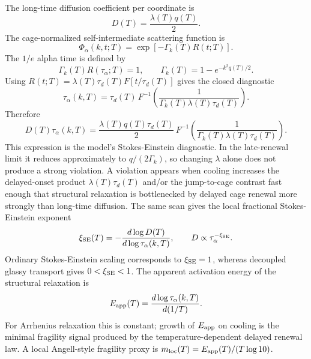 \documentclass[aps,preprint,onecolumn,superscriptaddress,nofootinbib]{revtex4-2}
\begin{document}
The long-time diffusion coefficient per coordinate is
\begin{equation}
  D(T)=\frac{\lambda(T)q(T)}{2}.
\end{equation}
The cage-normalized self-intermediate scattering function is
\begin{equation}
  \Phi_\alpha(k,t;T)=\exp[-\Gamma_k(T)R(t;T)].
\end{equation}
The $1/e$ alpha time is defined by
\begin{equation}
  \Gamma_k(T)R(\tau_\alpha;T)=1,\qquad
  \Gamma_k(T)=1-e^{-k^2q(T)/2}.
\end{equation}
Using $R(t;T)=\lambda(T)\tau_d(T)F[t/\tau_d(T)]$ gives the closed diagnostic
\begin{equation}
  \tau_\alpha(k,T)=
  \tau_d(T)\,
  F^{-1}\left(
    \frac{1}{\Gamma_k(T)\lambda(T)\tau_d(T)}
  \right).
\end{equation}
Therefore
\begin{equation}
  D(T)\tau_\alpha(k,T)=
  \frac{\lambda(T)q(T)\tau_d(T)}{2}\,
  F^{-1}\left(
    \frac{1}{\Gamma_k(T)\lambda(T)\tau_d(T)}
  \right).
\end{equation}
This expression is the model's Stokes-Einstein diagnostic. In the late-renewal
limit it reduces approximately to $q/(2\Gamma_k)$, so changing $\lambda$ alone
does not produce a strong violation. A violation appears when cooling increases
the delayed-onset product $\lambda(T)\tau_d(T)$ and/or the jump-to-cage contrast
fast enough that structural relaxation is bottlenecked by delayed cage renewal
more strongly than long-time diffusion.
The same scan gives the local fractional Stokes-Einstein exponent
\begin{equation}
  \xi_{\rm SE}(T)=
  -\frac{d\log D(T)}{d\log\tau_\alpha(k,T)},
  \qquad D\propto\tau_\alpha^{-\xi_{\rm SE}}.
\end{equation}
Ordinary Stokes-Einstein scaling corresponds to $\xi_{\rm SE}=1$, whereas
decoupled glassy transport gives $0<\xi_{\rm SE}<1$.
The apparent activation energy of the structural relaxation is
\begin{equation}
  E_{\rm app}(T)=
  \frac{d\log \tau_\alpha(k,T)}{d(1/T)}.
\end{equation}
For Arrhenius relaxation this is constant; growth of $E_{\rm app}$ on cooling
is the minimal fragility signal produced by the temperature-dependent delayed
renewal law. A local Angell-style fragility proxy is
$m_{\rm loc}(T)=E_{\rm app}(T)/(T\log 10)$.
\end{document}

